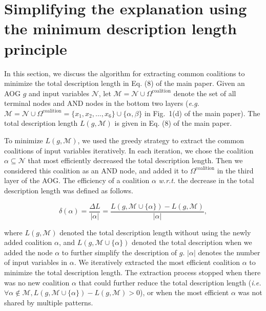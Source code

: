 \section{Simplifying the explanation using the minimum description length principle}
\label{sec:app-mdl}

In this section, we discuss the algorithm for extracting common coalitions to minimize the total description length in Eq. (8) of the main paper.
Given an AOG {\small$g$} and input variables {\small $\mathcal{N}$}, let {\small $\mathcal{M}=\mathcal{N}\cup \Omega^{\text{coalition}}$} denote the set of all terminal nodes and AND nodes in the bottom two layers
(\emph{e.g.} {\small $\mathcal{M}=\mathcal{N}\cup\Omega^{\text{coalition}}=\{x_1,x_2,...,x_6\}\cup\{\alpha, \beta\}$} in Fig.~1(d) of the main paper).
The total description length {\small$L(g,\mathcal{M})$} is given in Eq. (8) of the main paper.

To minimize {\small$L(g,\mathcal{M})$}, we used the  greedy strategy to extract the common coalitions of input variables iteratively.
In each iteration, we chose the coalition {\small$\alpha\subseteq \mathcal{N}$} that most efficiently decreased the total description length.
Then we considered this coalition as an AND node, and added it to {\small$\Omega^{\text{coalition}}$} in the third layer of the AOG.
The efficiency of a coalition {\small$\alpha$} \emph{w.r.t.} the decrease in the total description length was defined as follows.


\begin{small}
\begin{equation}
    \delta(\alpha) = \frac{\Delta L}{|\alpha|}=\frac{L(g,\mathcal{M}\cup\{\alpha\})-L(g,\mathcal{M})}{|\alpha|},
    \label{eq:mdl-decrease-efficiency}
\end{equation}
\end{small}

where {\small$L(g,\mathcal{M})$} denoted the total description length without using the newly added coalition {\small$\alpha$}, and {\small$L(g,\mathcal{M}\cup\{\alpha\})$} denoted the total description when we added the node {\small$\alpha$} to further simplify the description of {\small$g$}.
{\small $|\alpha|$} denotes the number of input variables in {\small $\alpha$}.
We iteratively extracted the most efficient coalition {\small$\alpha$} to minimize the total description length.
The extraction process stopped when there was no new coalition {\small$\alpha$} that could further reduce the total description length (\emph{i.e.} {\small$\forall \alpha \notin \mathcal{M}, L(g,\mathcal{M}\cup\{\alpha\})-L(g,\mathcal{M})>0$}), or when the most efficient {\small$\alpha$} was not shared by multiple patterns.



